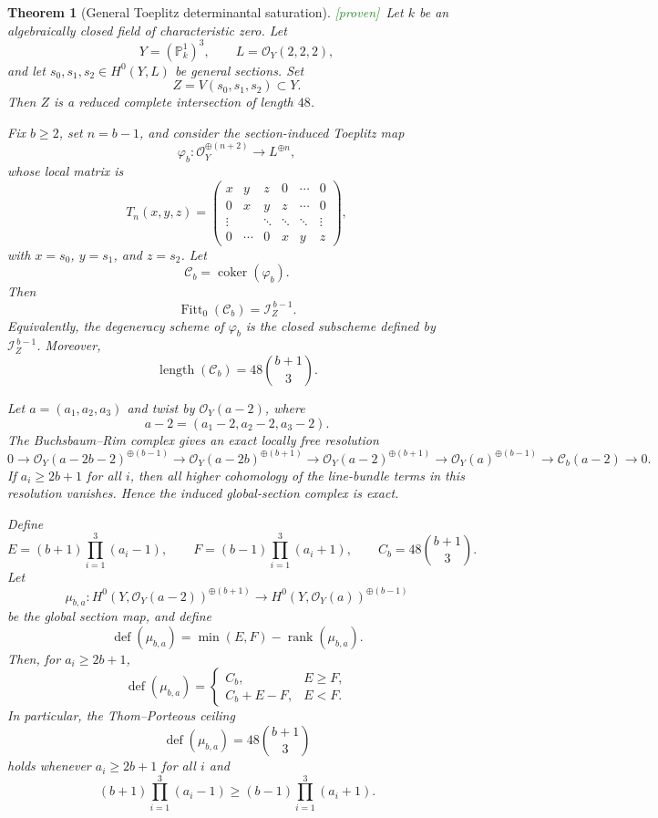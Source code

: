 \documentclass[11pt]{article}
\theoremstyle{plain}
\newtheorem{theorem}{Theorem}[section]
\theoremstyle{definition}
\theoremstyle{remark}
\newcommand{\Proven}{\textcolor{ForestGreen}{\textsf{[proven]}}}
\newcommand{\PP}{\mathbb{P}}
\newcommand{\cO}{\mathcal{O}}
\newcommand{\cI}{\mathcal{I}}
\newcommand{\cC}{\mathcal{C}}
\newcommand{\rank}{\operatorname{rank}}
\newcommand{\defect}{\operatorname{def}}
\DeclareMathOperator{\Coker}{coker}
\begin{document}
\begin{theorem}[General Toeplitz determinantal saturation]\label{thm:general-toeplitz-saturation}
\Proven\ Let $k$ be an algebraically closed field of characteristic zero.  Let
\[
Y=(\PP^1_k)^3,\qquad L=\cO_Y(2,2,2),
\]
and let $s_0,s_1,s_2\in H^0(Y,L)$ be general sections.  Set
\[
Z=V(s_0,s_1,s_2)\subset Y.
\]
Then $Z$ is a reduced complete intersection of length $48$.

Fix $b\ge2$, set $n=b-1$, and consider the section-induced Toeplitz map
\[
\varphi_b:\cO_Y^{\oplus(n+2)}\longrightarrow L^{\oplus n},
\]
whose local matrix is
\[
T_n(x,y,z)=
\begin{pmatrix}
x&y&z&0&\cdots&0\\
0&x&y&z&\cdots&0\\
\vdots&&\ddots&\ddots&\ddots&\vdots\\
0&\cdots&0&x&y&z
\end{pmatrix},
\]
with $x=s_0$, $y=s_1$, and $z=s_2$.  Let
\[
\cC_b=\Coker(\varphi_b).
\]
Then
\[
\operatorname{Fitt}_0(\cC_b)=\cI_Z^{\,b-1}.
\]
Equivalently, the degeneracy scheme of $\varphi_b$ is the closed subscheme defined by $\cI_Z^{\,b-1}$.  Moreover,
\[
\operatorname{length}(\cC_b)=48\binom{b+1}{3}.
\]

Let $a=(a_1,a_2,a_3)$ and twist by $\cO_Y(a-2)$, where
\[
a-2=(a_1-2,a_2-2,a_3-2).
\]
The Buchsbaum--Rim complex gives an exact locally free resolution
\[
0\to
\cO_Y(a-2b-2)^{\oplus(b-1)}
\to
\cO_Y(a-2b)^{\oplus(b+1)}
\to
\cO_Y(a-2)^{\oplus(b+1)}
\to
\cO_Y(a)^{\oplus(b-1)}
\to
\cC_b(a-2)
\to 0.
\]
If $a_i\ge2b+1$ for all $i$, then all higher cohomology of the line-bundle terms in this resolution vanishes.  Hence the induced global-section complex is exact.

Define
\[
E=(b+1)\prod_{i=1}^3(a_i-1),\qquad
F=(b-1)\prod_{i=1}^3(a_i+1),\qquad
C_b=48\binom{b+1}{3}.
\]
Let
\[
\mu_{b,a}:H^0(Y,\cO_Y(a-2))^{\oplus(b+1)}
\longrightarrow
H^0(Y,\cO_Y(a))^{\oplus(b-1)}
\]
be the global section map, and define
\[
\defect(\mu_{b,a})=\min(E,F)-\rank(\mu_{b,a}).
\]
Then, for $a_i\ge2b+1$,
\[
\defect(\mu_{b,a})=
\begin{cases}
C_b, & E\ge F,\\[4pt]
C_b+E-F, & E<F.
\end{cases}
\]
In particular, the Thom--Porteous ceiling
\[
\defect(\mu_{b,a})=48\binom{b+1}{3}
\]
holds whenever $a_i\ge2b+1$ for all $i$ and
\[
(b+1)\prod_{i=1}^3(a_i-1)\ge(b-1)\prod_{i=1}^3(a_i+1).
\]
\end{theorem}
\end{document}
